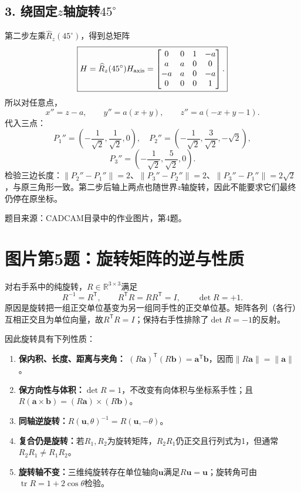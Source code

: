 \subsection*{3. 绕固定$z$轴旋转$45^\circ$}
第二步左乘$\widehat R_z(45^\circ)$，得到总矩阵
\[
\boxed{H=\widehat R_z(45^\circ)H_{\rm axis}
=\begin{bmatrix}
0&0&1&-a\\
a&a&0&0\\
-a&a&0&-a\\
0&0&0&1
\end{bmatrix}.}
\]
所以对任意点，
\[
x''=z-a,\qquad y''=a(x+y),\qquad z''=a(-x+y-1).
\]
代入三点：
\[
\boxed{P_1''=\left(-\frac1{\sqrt2},\frac1{\sqrt2},0\right),\quad
P_2''=\left(-\frac1{\sqrt2},\frac3{\sqrt2},-\sqrt2\right),}
\]
\[
\boxed{P_3''=\left(-\frac1{\sqrt2},\frac5{\sqrt2},0\right).}
\]
检验三边长度：$\|P_2''-P_1''\|=2$、$\|P_3''-P_2''\|=2$、$\|P_3''-P_1''\|=2\sqrt2$，与原三角形一致。第二步后轴上两点也随世界$z$轴旋转，因此不能要求它们最终仍停在原坐标。

{\footnotesize\color{mygr}题目来源：CADCAM目录中的作业图片，第4题。}

\section{图片第5题：旋转矩阵的逆与性质}
\sol 对右手系中的纯旋转，$R\in\mathbb R^{3\times3}$满足
\[
\boxed{R^{-1}=R^{\mathsf T},\qquad R^{\mathsf T}R=RR^{\mathsf T}=I,\qquad\det R=+1.}
\]
原因是旋转把一组正交单位基变为另一组同手性的正交单位基。矩阵各列（各行）互相正交且为单位向量，故$R^{\mathsf T}R=I$；保持右手性排除了$\det R=-1$的反射。

因此旋转具有下列性质：
\begin{enumerate}
\item \textbf{保内积、长度、距离与夹角：}
$(R\boldsymbol a)^{\mathsf T}(R\boldsymbol b)=\boldsymbol a^{\mathsf T}\boldsymbol b$，因而$\|R\boldsymbol a\|=\|\boldsymbol a\|$。
\item \textbf{保方向性与体积：}$\det R=1$，不改变有向体积与坐标系手性；且$R(\boldsymbol a\times\boldsymbol b)=(R\boldsymbol a)\times(R\boldsymbol b)$。
\item \textbf{同轴逆旋转：}$R(\boldsymbol u,\theta)^{-1}=R(\boldsymbol u,-\theta)$。
\item \textbf{复合仍是旋转：}若$R_1,R_2$为旋转矩阵，$R_2R_1$仍正交且行列式为1，但通常$R_2R_1\ne R_1R_2$。
\item \textbf{旋转轴不变：}三维纯旋转存在单位轴向$\boldsymbol u$满足$R\boldsymbol u=\boldsymbol u$；旋转角可由$\operatorname{tr}R=1+2\cos\theta$检验。
\end{enumerate}


